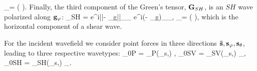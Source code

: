 \gv_\theta = \left( \times \gvn \right). 
\eeq
Finally, the third component of the Green's tensor, $\mathbf{G}_{SH}$, is an $SH$ wave polarized along $\mathbf{g}_\varphi$:
\beq \label{eq:GvSH}
\Gv_{SH} =  e^{i||\xv - \xv_g||}\gv_{\phi}\gv_{\phi} \simeq 
{} e^{i\gv\cdot(\xv - \xv_g)}\gv_{\phi}\gv_{\phi},
\gv_\phi = \left( \right),
\eeq
which is the horizontal component of a shear wave.

For the incident wavefield we consider point forces in three directions $\mathbf{\bar{\mathbf{s}}}, \mathbf{s}_\varphi, \mathbf{s}_\theta$, leading to three respective wavetypes:
\beq \label{eq:P_sou}
\Uv_{0P} = \Gv_P(\xv_s,\xv) \cdot \svn,
\eeq
\beq
\Uv_{0SV} = \Gv_{SV}(\xv_s,\xv) \cdot \sv_\theta,
\eeq
\beq
\Uv_{0SH} = \Gv_{SH}(\xv_s,\xv) \cdot \sv_\phi.
\eeq



